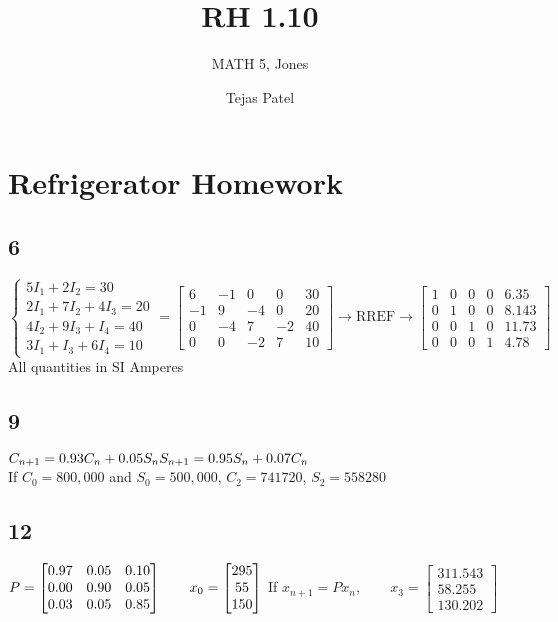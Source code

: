 \documentclass{article}
\title{RH 1.10}
\author{MATH 5, Jones}
\date{Tejas Patel}
\begin{document}
\maketitle
\section*{Refrigerator Homework}
\subsection*{6}
$\begin{cases}
  5I_1 + 2I_2 = 30 \\
  2I_1 + 7I_2 + 4I_3 = 20 \\
  4I_2 + 9I_3 + I_4 = 40 \\
  3I_1 + I_3 + 6I_4 = 10
  \end{cases} = \begin{bmatrix}6&-1&0&0&30\\-1&9&-4&0&20\\0&-4&7&-2&40\\0&0&-2&7&10\end{bmatrix} \rightarrow \text{RREF} \rightarrow \begin{bmatrix} 1 & 0 & 0 & 0 & 6.35 \\[0.1in] 0 & 1 & 0 & 0 & 8.143 \\[0.1in] 0 & 0 & 1 & 0 & 11.73 \\[0.1in] 0 & 0 & 0 & 1 & 4.78 \end{bmatrix}$ All quantities in SI Amperes
\subsection*{9}
$C_{n+1} = 0.93C_n + 0.05S_n \\ 
S_{n+1} = 0.95S_n + 0.07C_n$
\\If $C_0=800,000$ and $S_0=500,000$, $C_2=741720$, $S_2=558280$ 
\subsection*{12}

$P = \begin{bmatrix}
  0.97 & 0.05 & 0.10 \\
  0.00 & 0.90 & 0.05 \\
  0.03 & 0.05 & 0.85
  \end{bmatrix} \qquad 
  x_0 = \begin{bmatrix} 295 \\ 55 \\ 150 \end{bmatrix} \\[0.1in] 
$ If $  x_{n+1} = P x_n, \qquad x_3=\begin{bmatrix}
  311.543\\  58.255\\ 130.202
\end{bmatrix}$


   
\end{document}
